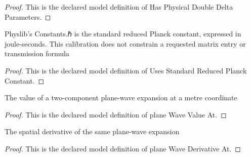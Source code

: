 \begin{proof}
  This is the declared model definition of Has Physical Double Delta Parameters.
\end{proof}
\begin{definition}
  \label{def:physics:phyx-mini-0602:phyxminiproblems-problemphyxmini0602-usesstandardreducedplanckconstant}
  Physlib's Constants.ℏ is the standard reduced Planck constant, expressed in joule-seconds. This calibration does not constrain a requested matrix entry or transmission formula
\end{definition}
\begin{proof}
  This is the declared model definition of Uses Standard Reduced Planck Constant.
\end{proof}
\begin{definition}
  \label{def:physics:phyx-mini-0602:phyxminiproblems-problemphyxmini0602-planewavevalueat}
  The value of a two-component plane-wave expansion at a metre coordinate
\end{definition}
\begin{proof}
  This is the declared model definition of plane Wave Value At.
\end{proof}
\begin{definition}
  \label{def:physics:phyx-mini-0602:phyxminiproblems-problemphyxmini0602-planewavederivativeat}
  The spatial derivative of the same plane-wave expansion
\end{definition}
\begin{proof}
  This is the declared model definition of plane Wave Derivative At.
\end{proof}
